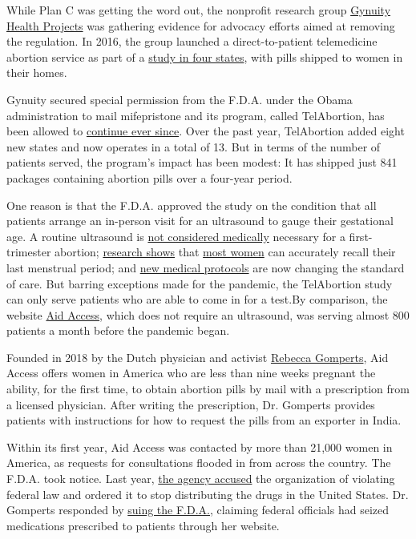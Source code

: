 While Plan C was getting the word out, the nonprofit research group
\href{https://gynuity.org/}{Gynuity Health Projects} was gathering
evidence for advocacy efforts aimed at removing the regulation. In 2016,
the group launched a direct-to-patient telemedicine abortion service as
part of a
\href{https://www.nytimes.com/2016/11/11/health/abortion-study-mail.html}{study
in four states}, with pills shipped to women in their homes.

Gynuity secured special permission from the F.D.A. under the Obama
administration to mail mifepristone and its program, called TelAbortion,
has been allowed to
\href{https://www.nytimes.com/2020/04/28/health/telabortion-abortion-telemedicine.html}{continue
ever since}. Over the past year, TelAbortion added eight new states and
now operates in a total of 13. But in terms of the number of patients
served, the program's impact has been modest: It has shipped just 841
packages containing abortion pills over a four-year period.

One reason is that the F.D.A. approved the study on the condition that
all patients arrange an in-person visit for an ultrasound to gauge their
gestational age. A routine ultrasound is
\href{https://www.guttmacher.org/state-policy/explore/requirements-ultrasound}{not
considered medically} necessary for a first-trimester abortion;
\href{https://www.ncbi.nlm.nih.gov/pubmed/21091926}{research shows} that
\href{https://www.ncbi.nlm.nih.gov/pubmed/25152258}{most women} can
accurately recall their last menstrual period; and
\href{https://www.ncbi.nlm.nih.gov/pmc/articles/PMC7161512/\#b0090}{new
medical protocols} are now changing the standard of care. But barring
exceptions made for the pandemic, the TelAbortion study can only serve
patients who are able to come in for a test.By comparison, the website
\href{https://aidaccess.org/}{Aid Access}, which does not require an
ultrasound, was serving almost 800 patients a month before the pandemic
began.

Founded in 2018 by the Dutch physician and activist
\href{https://www.nytimes.com/2001/08/26/magazine/the-pro-choice-extremist.html}{Rebecca
Gomperts}, Aid Access offers women in America who are less than nine
weeks pregnant the ability, for the first time, to obtain abortion pills
by mail with a prescription from a licensed physician. After writing the
prescription, Dr. Gomperts provides patients with instructions for how
to request the pills from an exporter in India.

Within its first year, Aid Access was contacted by more than 21,000
women in America, as requests for consultations flooded in from across
the country. The F.D.A. took notice. Last year,
\href{https://www.fda.gov/inspections-compliance-enforcement-and-criminal-investigations/warning-letters/aidaccessorg-575658-03082019}{the
agency accused} the organization of violating federal law and ordered it
to stop distributing the drugs in the United States. Dr. Gomperts
responded by
\href{https://www.npr.org/2019/09/09/758871490/european-doctor-who-prescribes-abortion-pills-to-u-s-women-online-sues-fda}{suing
the F.D.A.}, claiming federal officials had seized medications
prescribed to patients through her website.

